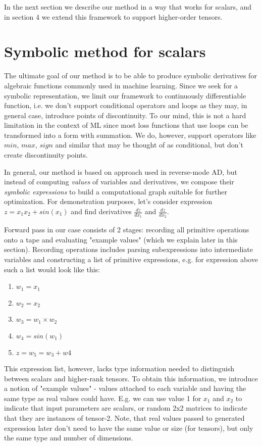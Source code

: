 \documentclass[conference]{IEEEtran}
\begin{document}
In the next section we describe our method in a way that works for
scalars, and in section 4 we extend this framework to support
higher-order tensors.

\section{Symbolic method for scalars}

The ultimate goal of our method is to be able to produce symbolic
derivatives for algebraic functions commonly used in machine
learning. Since we seek for a symbolic representation, we limit our
framework to continuously differentiable function, i.e. we don't
support conditional operators and loops as they may, in general case,
introduce points of discontinuity. To our mind, this is not a hard
limitation in the context of ML since most loss functions that use
loops can be transformed into a form with summation. We do, however,
support operators like $min$, $max$, $sign$ and similar that may be
thought of as conditional, but don't create discontinuity points.

In general, our method is based on approach used in reverse-mode AD,
but instead of computing \textit{values} of variables and derivatives,
we compose their \textit{symbolic expressions} to build a
computational graph suitable for further optimization. For
demonstration purposes, let's consider expression
$z = x_1x_2 + sin(x_1)$ and find derivatives $\frac{dz}{dx_1}$ and
$\frac{dz}{dx_2}$.

Forward pass in our case consists of 2 stages: recording all primitive
operations onto a tape and evaluating "example values" (which we
explain later in this section). Recording operations includes parsing
subexpressions into intermediate variables and constructing a list of
primitive expressions, e.g. for expression above such a list would
look like this:

\begin{enumerate}
\item $w_1 = x_1$
\item $w_2 = x_2$
\item $w_3 = w_1 \times w_2$
\item $w_4 = sin(w_1)$
\item $z = w_5 = w_3 + w4$
\end{enumerate}

This expression list, however, lacks type information needed to
distinguish between scalars and higher-rank tensors. To obtain this
information, we introduce a notion of "example values" - values
attached to each variable and having the same type as real values
could have. E.g. we can use value 1 for $x_1$ and $x_2$ to indicate
that input parameters are scalars, or random 2x2 matrices to indicate
that they are instances of tensor-2. Note, that real values passed to
generated expression later don't need to have the same value or size
(for tensors), but only the same type and number of dimensions.
\end{document}
